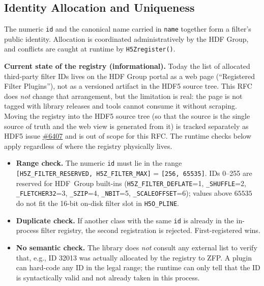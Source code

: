 \documentclass[../RFC-HDFG-2026-001.tex]{subfiles}
\begin{document}
\subsection{Identity Allocation and Uniqueness}
\label{sec:identity-allocation}

The numeric \texttt{id} and the canonical name carried in \texttt{name}
together form a filter's public identity.  Allocation is coordinated administratively
by the HDF Group, and conflicts are caught at runtime by
\texttt{H5Zregister()}.

\textbf{Current state of the registry (informational).}  Today the
list of allocated third-party filter IDs lives on the HDF Group
portal as a web page (``Registered Filter Plugins''), not as a
versioned artifact in the HDF5 source tree.  This RFC does \emph{not}
change that arrangement, but the limitation is real: the page is not
tagged with library releases and tools cannot consume it without
scraping.  Moving the registry into the HDF5 source tree (so that the
source is the single source of truth and the web view is generated
from it) is tracked separately as HDF5 issue
\href{https://github.com/HDFGroup/hdf5/issues/6407}{\#6407} and is
out of scope for this RFC.  The runtime checks below apply regardless of where the
registry physically lives.


\begin{itemize}
\item \textbf{Range check.}  The numeric \texttt{id} must lie in
  the range \texttt{[H5Z\_FILTER\_RESERVED, H5Z\_FILTER\_MAX]} =
  \texttt{[256, 65535]}.  IDs 0--255 are reserved for HDF~Group built-ins
  (\texttt{H5Z\_FILTER\_DEFLATE}=1, \texttt{\_SHUFFLE}=2,
  \texttt{\_FLETCHER32}=3, \texttt{\_SZIP}=4, \texttt{\_NBIT}=5,
  \texttt{\_SCALEOFFSET}=6); values above $65535$ do not fit the
  16-bit on-disk filter slot in \texttt{H5O\_PLINE}.
\item \textbf{Duplicate check.}  If another class with the same
  \texttt{id} is already in the in-process filter registry, the second
  registration is rejected.  First-registered wins.
\item \textbf{No semantic check.}  The library does \emph{not} consult
  any external list to verify that, e.g., ID 32013 was actually
  allocated by the registry to ZFP.  A plugin can hard-code any ID in
  the legal range; the runtime can only tell that the ID is
  syntactically valid and not already taken in this process.
\end{itemize}
\end{document}
